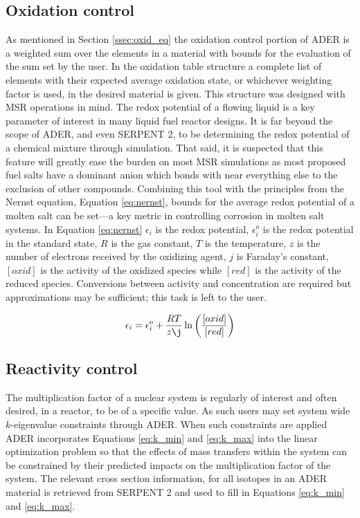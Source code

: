 \subsection{Oxidation control} \label{ssec:oxi}
As mentioned in Section \ref{ssec:oxid_eq} the oxidation control portion of 
ADER is a weighted sum over
the elements in a material with bounds for the evaluation of the sum set by 
the user. In the oxidation table structure a complete list
of elements with their expected average oxidation state, or whichever weighting
factor is used, in the desired material is given. This structure was designed 
with MSR operations in mind. The redox potential of a flowing liquid
is a key parameter of interest in many liquid fuel reactor designs. It is far 
beyond the scope of ADER, and even SERPENT 2, to be determining the redox 
potential of a chemical mixture through simulation. 
That said, it is suspected that this feature will greatly ease the
burden on most MSR simulations as most proposed fuel salts have a dominant
anion which bonds with near everything else to the exclusion of other
compounds. Combining this tool with the principles from the Nernst equation,
Equation \ref{eq:nernst}, bounds for the average redox potential of a molten
salt can be set---a key metric in controlling corrosion in molten salt systems.
In Equation \ref{eq:nernst} $\epsilon_{i}$ is the redox potential,
$\epsilon_{i}^{o}$ is the redox potential in the standard state, $R$ is the gas
constant, $T$ is the temperature, $z$ is the number of electrons received by the
oxidizing agent, $j$ is Faraday's constant, $[oxid]$ is the activity of the 
oxidized species while $[red]$ is the activity of the reduced species.
Conversions between activity and concentration are required but approximations 
may be sufficient; this task is left to the user.

\begin{equation}
\label{eq:nernst}
    \epsilon_{i} = \epsilon_{i}^{o} + \frac{RT}{z \j}\ln\left(\frac{[oxid]}{[red]}\right)
\end{equation}


\subsection{Reactivity control} \label{ssec:reactivity}
The multiplication factor of a nuclear system is regularly of interest
and often desired, in a reactor, to be of a specific value.
As such users may set system wide $k$-eigenvalue
constraints through ADER. When such constraints are applied ADER
incorporates Equations \ref{eq:k_min} and \ref{eq:k_max} into
the linear optimization problem so that the effects of mass transfers
within the system can be constrained by their predicted impacts on
the multiplication factor of the system. The relevant cross section information,
for all isotopes in an ADER material is retrieved from SERPENT 2 and used to 
fill in Equations \ref{eq:k_min} and \ref{eq:k_max}. 

